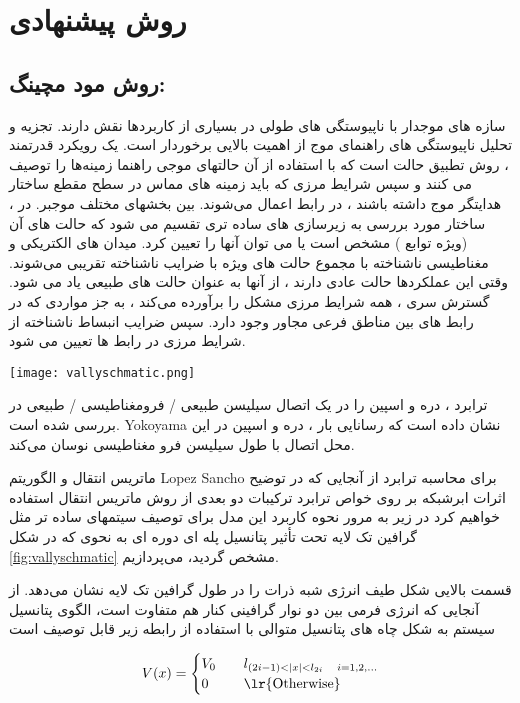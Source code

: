 \chapter{روش پیشنهادی}
\clearpage

\section{روش مود مچینگ:}
سازه های موجدار با ناپیوستگی های طولی در بسیاری از کاربردها نقش دارند. تجزیه و تحلیل ناپیوستگی های راهنمای موج از اهمیت بالایی برخوردار است. یک رویکرد قدرتمند ، روش تطبیق حالت  است که با استفاده از آن حالتهای موجی راهنما زمینه‌ها را توصیف می کنند و سپس شرایط مرزی که باید زمینه های مماس در سطح مقطع ساختار هدایتگر موج داشته باشند ، در رابط اعمال می‌شوند. بین بخشهای مختلف موجبر. در  ، ساختار مورد بررسی به زیرسازی های ساده تری تقسیم می شود که حالت های آن (ویژه توابع ) مشخص است یا می توان آنها را تعیین کرد. میدان های الکتریکی و مغناطیسی ناشناخته با مجموع حالت های ویژه با ضرایب ناشناخته تقریبی می‌شوند. وقتی این عملکردها حالت عادی دارند ، از آنها به عنوان حالت های طبیعی یاد می شود. گسترش سری ، همه شرایط مرزی مشکل را برآورده می‌کند ، به جز مواردی که در رابط های بین مناطق فرعی مجاور وجود دارد. سپس ضرایب انبساط ناشناخته از شرایط مرزی در رابط ها تعیین می شود.
\begin{figure*}
    \centering
    \texttt{[image: vallyschmatic.png]}
    \caption{اتصال سیلیسین معمولی / فرومغناطیسی / معمولی}
    \label{fig:vallyschmatic}
\end{figure*}
ترابرد ، دره و اسپین را در یک اتصال سیلیسن طبیعی / فرومغناطیسی / طبیعی در \cite{yokoyamaControllableValleySpin2013} بررسی شده است. \gls{Yokoyama} نشان داده است که رسانایی بار ، دره و اسپین در این محل اتصال با طول سیلیسن فرو مغناطیسی نوسان می‌کند.

ماتریس انتقال و الگوریتم \gls{Lopez Sancho} برای محاسبه ترابرد
از آنجایی که در توضیح اثرات ابرشبکه بر روی خواص ترابرد ترکیبات دو بعدی از روش ماتریس انتقال استفاده خواهیم کرد در زیر به مرور نحوه کاربرد این مدل برای توصیف سیتمهای ساده تر مثل گرافین تک لایه تحت تأثیر پتانسیل پله ای دوره ای به نحوی که در شکل \ref{fig:vallyschmatic} مشخص گردید، می‌پردازیم.

قسمت بالایی شکل طیف انرژی شبه ذرات را در طول گرافین تک لایه نشان می‌دهد. از آنجایی که انرژی فرمی بین دو نوار گرافینی کنار هم متفاوت است، الگوی پتانسیل سیستم به شکل چاه های پتانسیل متوالی با استفاده از رابطه زیر قابل توصیف است

\begin{equation}
	V(x) = \begin{cases}
    V_0 &\quad l_{(2i-1)< |x| < l_{2i}\quad i=1,2,\dots}\\
    0 &\quad\text{\lr{Otherwise}}
\end{cases}
\end{equation}

